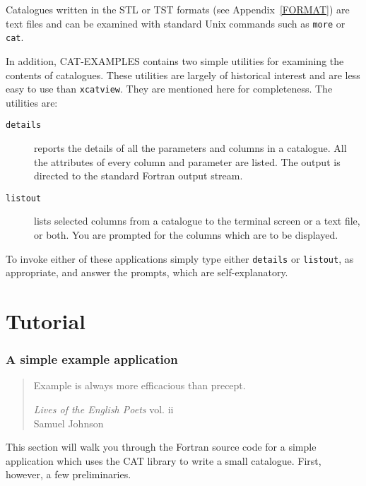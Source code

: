 \documentclass[11pt,twoside]{starlink}
\begin{document}
Catalogues written in the STL or TST formats (see Appendix~\ref{FORMAT})
are text files and can be examined with standard Unix commands such
as \texttt{more} or \texttt{cat}.

In addition, CAT-EXAMPLES contains two simple utilities for examining the
contents of catalogues.  These utilities are largely of historical
interest and are less easy to use than \texttt{xcatview}.  They are mentioned
here for completeness.  The utilities are:

\begin{description}

  \item[\texttt{details}] reports the details of all the parameters and
   columns in a catalogue. All the attributes of every column and
   parameter are listed. The output is directed to the standard Fortran
   output stream.

  \item[\texttt{listout}] lists selected columns from a catalogue to the
   terminal screen or a text file, or both. You are prompted for the
   columns which are to be displayed.

\end{description}

To invoke either of these applications simply type either \texttt{details}
or \texttt{listout}, as appropriate, and answer the prompts, which are
self-explanatory.


\newpage
\part{Tutorial}


\section{\label{SIMPLE}A simple example application}

\begin{quote}
\begin{center}
Example is always more efficacious than precept.
\end{center}
\textit{Lives of the English Poets} vol. ii \latex{\raggedleft}
\\ Samuel Johnson
\end{quote}

This section will walk you through the Fortran source code for a simple
application which uses the CAT library to write a small catalogue.
First, however, a few preliminaries.
\end{document}
